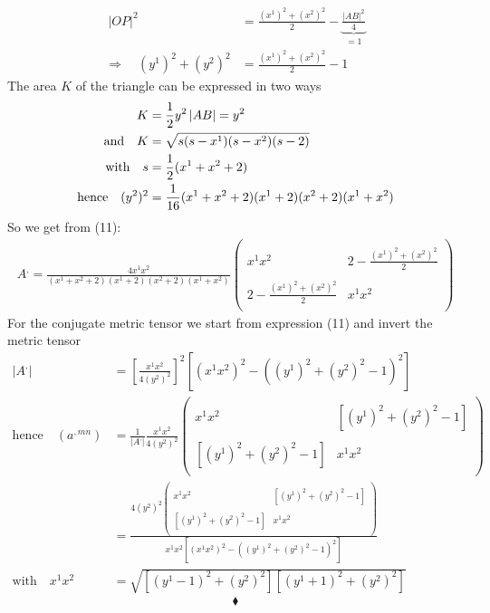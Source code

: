 \begin{align}
\ \left |  OP \right |^2 &= \frac{(x^1)^2+(x^2)^2}{2} - \underbrace{\frac{\left | AB \right|^2}{4}}_{=1}\\
\Rightarrow\quad (y^1)^2 +(y^2)^2 &= \frac{(x^1)^2+(x^2)^2}{2} - 1
\end{align}
The area $K$ of the triangle can be expressed in two ways
\begin{align}
\ K &= \frac{1}{2} y^2\left | AB \right| = y^2\\
\text{and} \quad K &= \sqrt{s(s-x^1)(s-x^2)(s-2)}\\
\text{with}\quad s &= \frac{1}{2} (x^1+x^2+2)\\
\text{hence}\quad (y^2)^2 &= \frac{1}{16}(x^1+x^2+2)(x^1+2)(x^2+2)(x^1+x^2)
\end{align}
So we get from (11):
\begin{align}
A^, =\frac{4x^1x^2}{(x^1+x^2+2)(x^1+2)(x^2+2)(x^1+x^2)} \begin{pmatrix}
\ & \\
x^1x^2 &2-\frac{(x^1)^2+(x^2)^2}{2} \\\\
2-\frac{(x^1)^2+(x^2)^2}{2}  &x^1x^2\\
\ & 
\end{pmatrix}
\end{align}
For the conjugate metric tensor we start from expression (11) and invert the metric tensor
\begin{align}
\left| A^,\right| &= \left[ \frac{x^1x^2}{4(y^2)^2}\right]^2\left[(x^1x^2)^2 -\left((y^1)^2 +(y^2)^2-1\right)^2\right]\\
\text{hence}\quad \left(a^{,mn}\right) &= \frac{1}{\left| A^,\right|}\frac{x^1x^2}{4(y^2)^2} \begin{pmatrix}
\ & \\
x^1x^2 &\left[(y^1)^2 +(y^2)^2-1\right] \\\\
\left[(y^1)^2 +(y^2)^2-1\right]  &x^1x^2\\
\ & 
\end{pmatrix}\\
\ &= \frac{4(y^2)^2\begin{pmatrix}
\ & \\
x^1x^2 &\left[(y^1)^2 +(y^2)^2-1\right] \\\\
\left[(y^1)^2 +(y^2)^2-1\right]  &x^1x^2\\
\ & 
\end{pmatrix}}{x^1x^2\left[(x^1x^2)^2 -\left((y^1)^2 +(y^2)^2-1\right)^2\right]} \\
\text{with} \quad x^1x^2&= \sqrt{\left[(y^1-1)^2 +(y^2)^2\right]\left[(y^1+1)^2 +(y^2)^2\right]}
\end{align}
$$\blacklozenge$$
\newpage

